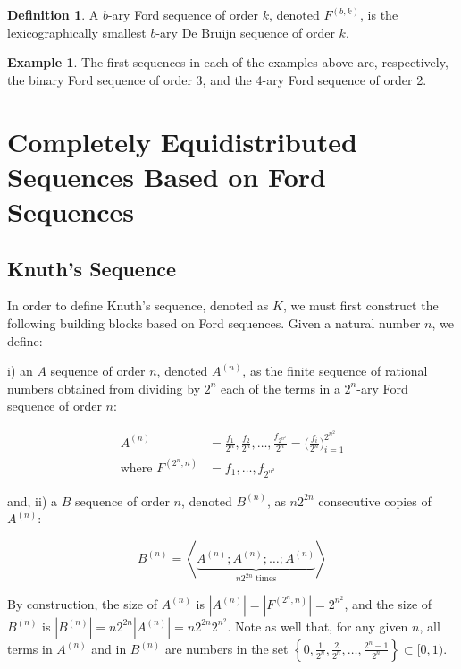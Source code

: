 \documentclass[11pt,a4paper]{tesis}
\theoremstyle{plain}
\theoremstyle{definition}
\newtheorem*{definition*}{Definition}
\newtheorem*{exmp*}{Example}
\begin{document}
\begin{definition*}
  A $b$-ary Ford sequence of order $k$, denoted $F^{(b, k)}$, is the lexicographically smallest $b$-ary De Bruijn sequence of order $k$.
\end{definition*}

\begin{exmp*}
  The first sequences in each of the examples above are, respectively, the binary Ford sequence of order 3, and the 4-ary Ford sequence of order 2.
\end{exmp*}

\chapter{Completely Equidistributed Sequences Based on Ford Sequences}\label{chapter:cesbofs}

\section{Knuth's Sequence}

In order to define Knuth's sequence, denoted as $K$, we must first construct the following building blocks based on Ford sequences. Given a natural number $n$, we define:

i) an $A$ sequence of order $n$, denoted $A^{(n)}$, as the finite sequence of rational numbers obtained from dividing by $2^n$ each of the terms in a $2^n$-ary Ford sequence of order $n$:

\begin{equation*}
  \begin{aligned}
    A^{(n)} & = \frac{f_1}{2^n}, \frac{f_2}{2^n}, \dots, \frac{f_{2^{n^2}}}{2^n} = \bigg( \frac{f_i}{2^n} \bigg)_{i = 1}^{2^{n^2}} \\
    \text{where } F^{(2^n, n)} & = f_1, \dots, f_{2^{n^2}}
  \end{aligned}
\end{equation*}

and, ii) a $B$ sequence of order $n$, denoted $B^{(n)}$, as $n 2^{2 n}$ consecutive copies of $A^{(n)}$:

\begin{equation*}
  B^{(n)} = \left< \underbrace{A^{(n)} ; A^{(n)} ; \dots ; A^{(n)}}_{n 2^{2 n} \text{ times}} \right>
\end{equation*}

By construction, the size of $A^{(n)}$ is $|A^{(n)}| = |F^{(2^n, n)}| = 2^{n^2}$, and the size of $B^{(n)}$ is $|B^{(n)}| = n 2^{2 n} |A^{(n)}| = n 2^{2 n} 2^{n^2}$. Note as well that, for any given $n$, all terms in $A^{(n)}$ and in $B^{(n)}$ are numbers in the set $\left \{ 0, \frac{1}{2^n}, \frac{2}{2^n}, \dots, \frac{2^n - 1}{2^n} \right \} \subset [0, 1)$.
\end{document}
